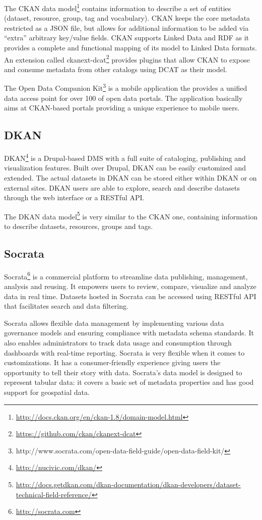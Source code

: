 The CKAN data model\footnote{\url{http://docs.ckan.org/en/ckan-1.8/domain-model.html}} contains information to describe a set of entities (dataset, resource, group, tag and vocabulary). CKAN keeps the core metadata restricted as a JSON file, but allows for additional information to be added via ``extra'' arbitrary key/value fields. CKAN supports Linked Data and RDF as it provides a complete and functional mapping of its model to Linked Data formats. An extension called ckanext-dcat\footnote{\url{https://github.com/ckan/ckanext-dcat}} provides plugins that allow CKAN to expose and consume metadata from other catalogs using DCAT as their model.

The Open Data Companion Kit\footnote{http://www.socrata.com/open-data-field-guide/open-data-field-kit/} is a mobile application the provides a unified data access point for over 100 of open data portals. The application basically aims at CKAN-based portals providing a unique experience to mobile users.

\subsection{DKAN}
DKAN\footnote{\url{http://nucivic.com/dkan/}} is a Drupal-based DMS with a full suite of cataloging, publishing and visualization features. Built over Drupal, DKAN can be easily customized and extended. The actual datasets in DKAN can be stored either within DKAN or on external sites. DKAN users are able to explore, search and describe datasets through the web interface or a RESTful API.

The DKAN data model\footnote{\url{http://docs.getdkan.com/dkan-documentation/dkan-developers/dataset-technical-field-reference/}} is very similar to the CKAN one, containing information to describe datasets, resources, groups and tags.

\subsection{Socrata}
Socrata\footnote{\url{http://socrata.com}} is a commercial platform to streamline data publishing, management, analysis and reusing. It empowers users to review, compare, visualize and analyze data in real time. Datasets hosted in Socrata can be accessed using RESTful API that facilitates search and data filtering.

Socrata allows flexible data management by implementing various data governance models and ensuring compliance with metadata schema standards. It also enables administrators to track data usage and consumption through dashboards with real-time reporting. Socrata is very flexible when it comes to customizations. It has a consumer-friendly experience giving users the opportunity to tell their story with data. Socrata's data model is designed to represent tabular data: it covers a basic set of metadata properties and has good support for geospatial data.


